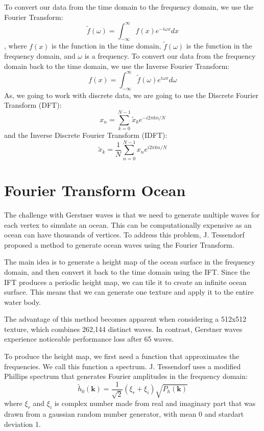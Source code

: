 To convert our data from the time domain to the frequency domain, we use the Fourier Transform:
\begin{equation}
\tilde{f}(\omega) = \int_{-\infty}^{\infty} f(x) e^{-i \omega x} dx
\end{equation}
, where $f(x)$ is the function in the time domain, $\tilde{f}(\omega)$ is the function in the frequency domain, and $\omega$ is a frequency.
To convert our data from the frequency domain back to the time domain, we use the Inverse Fourier Transform:
\begin{equation}
f(x) = \int_{-\infty}^{\infty} \tilde{f}(\omega) e^{i \omega x} d\omega
\end{equation}
As, we going to work with discrete data, we are going to use the Discrete Fourier Transform (DFT):
\begin{equation}
    x_n = \sum_{k=0}^{N-1} \tilde{x}_k e^{-i 2 \pi k n / N}
\end{equation}
and the Inverse Discrete Fourier Transform (IDFT):
\begin{equation}
    \tilde{x}_k = \frac{1}{N} \sum_{n=0}^{N-1} x_n e^{i 2 \pi k n / N}
    \label{eq:idft}
\end{equation}

\section{Fourier Transform Ocean}
The challenge with Gerstner waves is that we need to generate multiple waves for each vertex to simulate an ocean. This can be computationally expensive as an ocean can have thousands of vertices. To address this problem, J. Tessendorf\cite{tessendorf2001} proposed a method to generate ocean waves using the Fourier Transform.

The main idea is to generate a height map of the ocean surface in the frequency domain, and then convert it back to the time domain using the IFT. Since the IFT produces a periodic height map, we can tile it to create an infinite ocean surface. This means that we can generate one texture and apply it to the entire water body.

The advantage of this method becomes apparent when considering a 512x512 texture, which combines 262,144 distinct waves. In contrast, Gerstner waves experience noticeable performance loss after 65 waves.

To produce the height map, we first need a function that approximates the frequencies. We call this function a spectrum. J. Tessendorf uses a modified Phillips spectrum that generates Fourier amplitudes in the frequency domain:
\begin{equation}
    \tilde{h}_0(\mathbf{k}) = \frac{1}{\sqrt{2}}(\xi_r + \xi_i)\sqrt{P_h(\mathbf{k})}
    \label{eq:fouier_amplitudes}
\end{equation}
where $\xi_r$ and $\xi_i$ is complex number made from real and imaginary part that was drawn from a gaussian random number generator, with mean 0 and stardart deviation 1.

